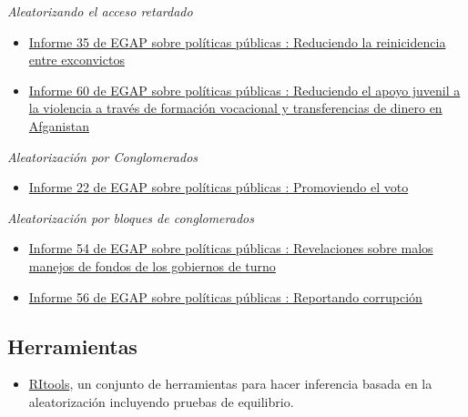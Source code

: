 \documentclass[
  12pt,
  spanish,
]{book}
\providecommand{\tightlist}{%
  \setlength{\itemsep}{0pt}\setlength{\parskip}{0pt}}
\begin{document}
\emph{Aleatorizando el acceso retardado}

\begin{itemize}
\item
  \href{https://egap.org/resource/brief-35-reducing-reconvictions-among-released-prisoners/}{Informe 35 de EGAP sobre políticas públicas : Reduciendo la reinicidencia entre exconvictos}
\item
  \href{https://egap.org/resource/reducing-youth-support-for-violence-through-training-and-cash-transfers-in-afghanistan/}{Informe 60 de EGAP sobre políticas públicas : Reduciendo el apoyo juvenil a la violencia a través de formación vocacional y transferencias de dinero en Afganistan}
\end{itemize}

\emph{Aleatorización por Conglomerados}

\begin{itemize}
\tightlist
\item
  \href{https://egap.org/resource/brief-22-getting-out-the-vote/}{Informe 22 de EGAP sobre políticas públicas : Promoviendo el voto}
\end{itemize}

\emph{Aleatorización por bloques de conglomerados}

\begin{itemize}
\item
  \href{https://egap.org/resource/evidence-from-mexico-the-effect-of-incumbent-malfeasance-revelations/}{Informe 54 de EGAP sobre políticas públicas : Revelaciones sobre malos manejos de fondos de los gobiernos de turno}
\item
  \href{https://egap.org/resource/reporting-corruption-in-nigeria-testing-the-effects-of-norms-nudges/}{Informe 56 de EGAP sobre políticas públicas : Reportando corrupción}
\end{itemize}

\hypertarget{herramientas-1}{%
\subsection{Herramientas}\label{herramientas-1}}

\begin{itemize}
\tightlist
\item
  \href{https://cran.r-project.org/web/packages/RItools/index.html}{RItools}, un conjunto de herramientas para hacer inferencia basada en la aleatorización incluyendo pruebas de equilibrio.
\end{itemize}
\end{document}
